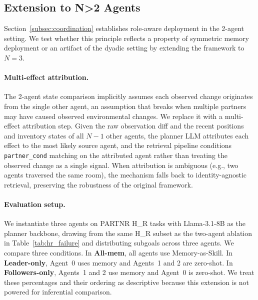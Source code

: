 \documentclass{article}
\theoremstyle{plain}
\theoremstyle{definition}
\theoremstyle{remark}
\begin{document}
\subsection{Extension to N>2 Agents}
\label{sec:n_agent_extension}

Section~\ref{subsec:coordination} establishes role-aware deployment in the 2-agent setting. We test whether this principle reflects a property of symmetric memory deployment or an artifact of the dyadic setting by extending the framework to $N{=}3$.

\paragraph{Multi-effect attribution.} The 2-agent state comparison implicitly assumes each observed change originates from the single other agent, an assumption that breaks when multiple partners may have caused observed environmental changes. We replace it with a multi-effect attribution step. Given the raw observation diff and the recent positions and inventory states of all $N{-}1$ other agents, the planner LLM attributes each effect to the most likely source agent, and the retrieval pipeline conditions \texttt{partner\_cond} matching on the attributed agent rather than treating the observed change as a single signal. When attribution is ambiguous (e.g., two agents traversed the same room), the mechanism falls back to identity-agnostic retrieval, preserving the robustness of the original framework.

\paragraph{Evaluation setup.} We instantiate three agents on PARTNR H\_R tasks with Llama-3.1-8B as the planner backbone, drawing from the same H\_R subset as the two-agent ablation in Table~\ref{tab:hr_failure} and distributing subgoals across three agents. We compare three conditions. In \textbf{All-mem}, all agents use Memory-as-Skill. In \textbf{Leader-only}, Agent~0 uses memory and Agents~1 and 2 are zero-shot. In \textbf{Followers-only}, Agents~1 and 2 use memory and Agent~0 is zero-shot. We treat these percentages and their ordering as descriptive because this extension is not powered for inferential comparison.
\end{document}

